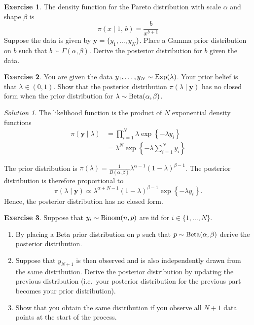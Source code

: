 \documentclass[
]{book}
\providecommand{\tightlist}{%
  \setlength{\itemsep}{0pt}\setlength{\parskip}{0pt}}
\theoremstyle{definition}
\theoremstyle{definition}
\theoremstyle{definition}
\newtheorem{exercise}{Exercise}[chapter]
\theoremstyle{definition}
\theoremstyle{remark}
\newtheorem*{solution}{Solution}
\begin{document}
\begin{exercise}
The density function for the Pareto distribution with scale \(\alpha\) and shape \(\beta\) is
\[
\pi(x \mid 1,\, b) = \frac{b}{x^{b+1}}
\]
Suppose the data is given by \(\boldsymbol{y} = \{y_1, \ldots, y_N\}\). Place a Gamma prior distribution on \(b\) such that \(b \sim \Gamma(\alpha, \beta)\). Derive the posterior distribution for \(b\) given the data.
\end{exercise}

\begin{exercise}
You are given the data \(y_1, \ldots, y_N \sim \hbox{Exp}(\lambda)\). Your prior belief is that \(\lambda \in (0, 1)\). Show that the posterior distribution \(\pi(\lambda \mid \boldsymbol{y})\) has no closed form when the prior distribution for \(\lambda \sim \hbox{Beta}(\alpha, \beta)\).
\end{exercise}

\begin{solution}
The likelihood function is the product of \(N\) exponential density functions
\begin{align*}
\pi(\boldsymbol{y} \mid \lambda) &= \prod_{i=1}^N \lambda \exp\left\{-\lambda y_i\right\}\\
& = \lambda^N  \exp\left\{-\lambda \sum_{i=1}^N y_i\right\}
\end{align*}

The prior distribution is \(\pi(\lambda) = \frac{1}{B(\alpha, \beta)}\lambda^{\alpha - 1}(1-\lambda)^{\beta - 1}\). The posterior distribution is therefore proportional to
\[
\pi(\lambda \mid \boldsymbol{y}) \propto \lambda^{\alpha +N - 1}(1-\lambda)^{\beta - 1}\exp\left\{-\lambda y_i\right\}.
\]
Hence, the posterior distribution has no closed form.
\end{solution}

\begin{exercise}

Suppose that \(y_i \sim \hbox{Binom}(n, p)\) are iid for \(i \in \{1, \ldots, N\}\).

\begin{enumerate}
\def\labelenumi{\arabic{enumi}.}
\tightlist
\item
  By placing a Beta prior distribution on \(p\) such that \(p \sim \hbox{Beta}(\alpha, \beta)\) derive the posterior distribution.
\item
  Suppose that \(y_{N+1}\) is then observed and is also independently drawn from the same distribution. Derive the posterior distribution by updating the previous distribution (i.e.~your posterior distribution for the previous part becomes your prior distribution).
\item
  Show that you obtain the same distribution if you observe all \(N+1\) data points at the start of the process.
\end{enumerate}

\end{exercise}
\end{document}
